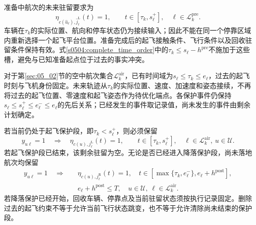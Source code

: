 准备中航次的未来驻留要求为
\begin{equation}
 \eta_{c(\widehat u_\ell),\widehat j_\ell^{\mathrm L}}(t)=1,
 \qquad t\in[\tau_k,s_\ell^+],\quad
 \ell\in\mathcal L_k^{\mathrm{pre}}.
 \label{s0504:prepared_remaining_dwell}
\end{equation}
车辆在$\tau_k$的实际位置、航向和停车状态仍为接续输入；因此不能在同一个停靠区域内重新选择一个起飞平台位置。准备完成后的起飞接触条件、飞行条件以及回收驻留条件保持有效。式\eqref{s0504:complete_time_order}中的$\tau_k\le s_\ell-h^{\mathrm{pre}}$不施加于这些槽，避免与已知准备起点位于过去的事实冲突。

对于第\ref{sec:05_02}节的空中航次集合$\mathcal L_k^{\mathrm{air}}$，已有时间域为$s_\ell\le\tau_k\le e_\ell$，过去的起飞时刻与飞机身份固定。未来轨迹从$\tau_k$的实际位置、速度、加速度和姿态接续，不再将过去的起飞位置、零速度和起飞姿态作为待优化端点。各保护事件仍保持$s_\ell\le s_\ell^+\le e_\ell^-\le e_\ell$的先后关系；已经发生的事件取记录值，尚未发生的事件由剩余计划确定。

若当前仍处于起飞保护段，即$\tau_k<s_\ell^+$，则必须保留
\begin{equation}
 y_{u\ell}=1\quad\Longrightarrow\quad
 \eta_{c(u),j_\ell^{\mathrm L}}(t)=1,
 \qquad t\in[\tau_k,s_\ell^+],\quad
 \ell\in\mathcal L_k^{\mathrm{air}},\ u\in\mathcal U.
 \label{s0504:airborne_launch_remainder}
\end{equation}
若起飞保护段已结束，该剩余驻留为空。无论是否已经进入降落保护段，尚未落地航次均保留
\begin{equation}
 \begin{aligned}
 y_{u\ell}=1\quad\Longrightarrow\quad
 &\eta_{c(u),j_\ell^{\mathrm R}}(t)=1,
 \quad t\in[\max\{\tau_k,e_\ell^-\},e_\ell+h^{\mathrm{post}}],\\
 &e_\ell+h^{\mathrm{post}}\le T,
 \quad u\in\mathcal U,\ \ell\in\mathcal L_k^{\mathrm{air}}.
 \end{aligned}
 \label{s0504:airborne_recovery_remainder}
\end{equation}
若降落保护已经开始，回收车辆、停靠点及当前驻留状态须按执行记录固定。删除过去的起飞约束不等于允许当前飞行状态跳变，也不等于允许清除尚未结束的保护段。

